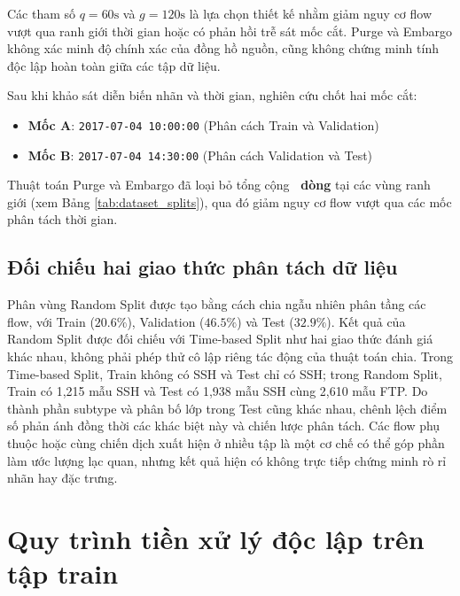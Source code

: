 Các tham số $q = 60\text{s}$ và $g = 120\text{s}$ là lựa chọn thiết kế nhằm giảm nguy cơ flow vượt qua ranh giới thời gian hoặc có phản hồi trễ sát mốc cắt. Purge và Embargo không xác minh độ chính xác của đồng hồ nguồn, cũng không chứng minh tính độc lập hoàn toàn giữa các tập dữ liệu.

Sau khi khảo sát diễn biến nhãn và thời gian, nghiên cứu chốt hai mốc cắt:
\begin{itemize}
    \item \textbf{Mốc A}: \texttt{2017-07-04 10:00:00} (Phân cách Train và Validation)
    \item \textbf{Mốc B}: \texttt{2017-07-04 14:30:00} (Phân cách Validation và Test)
\end{itemize}

Thuật toán Purge và Embargo đã loại bỏ tổng cộng \textbf{\DataPurgedRows\ dòng} tại các vùng ranh giới (xem Bảng \ref{tab:dataset_splits}), qua đó giảm nguy cơ flow vượt qua các mốc phân tách thời gian.

\subsection{Đối chiếu hai giao thức phân tách dữ liệu}
Phân vùng Random Split được tạo bằng cách chia ngẫu nhiên phân tầng các flow, với Train ($20.6\%$), Validation ($46.5\%$) và Test ($32.9\%$). Kết quả của Random Split được đối chiếu với Time-based Split như hai giao thức đánh giá khác nhau, không phải phép thử cô lập riêng tác động của thuật toán chia. Trong Time-based Split, Train không có SSH và Test chỉ có SSH; trong Random Split, Train có 1,215 mẫu SSH và Test có 1,938 mẫu SSH cùng 2,610 mẫu FTP. Do thành phần subtype và phân bố lớp trong Test cũng khác nhau, chênh lệch điểm số phản ánh đồng thời các khác biệt này và chiến lược phân tách. Các flow phụ thuộc hoặc cùng chiến dịch xuất hiện ở nhiều tập là một cơ chế có thể góp phần làm ước lượng lạc quan, nhưng kết quả hiện có không trực tiếp chứng minh rò rỉ nhãn hay đặc trưng.

\section{Quy trình tiền xử lý độc lập trên tập train}

